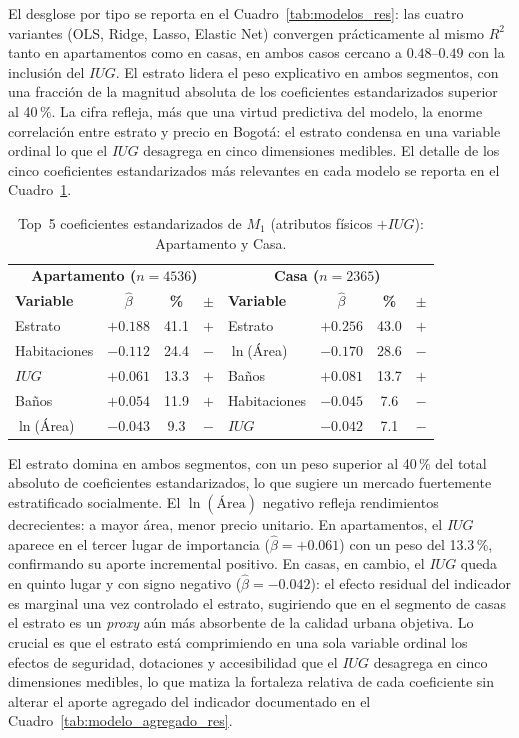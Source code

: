 \documentclass[12pt, a4paper, twoside, openright]{report}
\theoremstyle{plain}
\theoremstyle{definition}
\newcommand{\IUG}{IUG}             %
\begin{document}
El desglose por tipo se reporta en el Cuadro~\ref{tab:modelos_res}: las cuatro variantes (OLS, Ridge, Lasso, Elastic Net) convergen prácticamente al mismo $R^2$ tanto en apartamentos como en casas, en ambos casos cercano a $0.48$--$0.49$ con la inclusión del $\IUG{}$. El estrato lidera el peso explicativo en ambos segmentos, con una fracción de la magnitud absoluta de los coeficientes estandarizados superior al 40\,\%. La cifra refleja, más que una virtud predictiva del modelo, la enorme correlación entre estrato y precio en Bogotá: el estrato condensa en una variable ordinal lo que el $\IUG{}$ desagrega en cinco dimensiones medibles. El detalle de los cinco coeficientes estandarizados más relevantes en cada modelo se reporta en el Cuadro~\ref{tab:coefs_res}.

\begin{table}[htbp]
\centering
\caption{Top~5 coeficientes estandarizados de $M_1$ (atributos físicos $+\IUG$): Apartamento y Casa.}
\label{tab:coefs_res}
\begin{tabular}{@{}lccc|lccc@{}}
\toprule
\multicolumn{4}{c|}{\textbf{Apartamento ($n = \num{4536}$)}} &
\multicolumn{4}{c}{\textbf{Casa ($n = \num{2365}$)}} \\
\textbf{Variable} & $\hat{\beta}$ & \textbf{\%} & \textbf{$\pm$} &
\textbf{Variable} & $\hat{\beta}$ & \textbf{\%} & \textbf{$\pm$} \\
\midrule
Estrato       & $+0.188$  & 41.1 & $+$ & Estrato       & $+0.256$  & 43.0 & $+$ \\
Habitaciones  & $-0.112$  & 24.4 & $-$ & $\ln$(Área)   & $-0.170$  & 28.6 & $-$ \\
$\IUG{}$      & $+0.061$  & 13.3 & $+$ & Baños         & $+0.081$  & 13.7 & $+$ \\
Baños         & $+0.054$  & 11.9 & $+$ & Habitaciones  & $-0.045$  &  7.6 & $-$ \\
$\ln$(Área)   & $-0.043$  &  9.3 & $-$ & $\IUG{}$      & $-0.042$  &  7.1 & $-$ \\
\bottomrule
\end{tabular}
\end{table}

El estrato domina en ambos segmentos, con un peso superior al 40\,\% del total absoluto de coeficientes estandarizados, lo que sugiere un mercado fuertemente estratificado socialmente. El $\ln(\text{Área})$ negativo refleja rendimientos decrecientes: a mayor área, menor precio unitario. En apartamentos, el $\IUG{}$ aparece en el tercer lugar de importancia ($\hat{\beta} = +0.061$) con un peso del 13.3\,\%, confirmando su aporte incremental positivo. En casas, en cambio, el $\IUG{}$ queda en quinto lugar y con signo negativo ($\hat{\beta} = -0.042$): el efecto residual del indicador es marginal una vez controlado el estrato, sugiriendo que en el segmento de casas el estrato es un \emph{proxy} aún más absorbente de la calidad urbana objetiva. Lo crucial es que el estrato está comprimiendo en una sola variable ordinal los efectos de seguridad, dotaciones y accesibilidad que el $\IUG{}$ desagrega en cinco dimensiones medibles, lo que matiza la fortaleza relativa de cada coeficiente sin alterar el aporte agregado del indicador documentado en el Cuadro~\ref{tab:modelo_agregado_res}.
\end{document}
